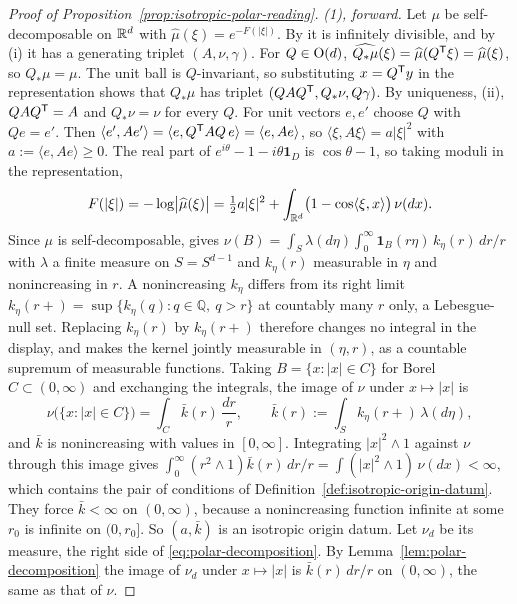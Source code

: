 \begin{proof}[Proof of Proposition~\ref{prop:isotropic-polar-reading}]
\emph{(1), forward.} Let $\mu$ be self-decomposable on $\mathbb{R}^d$ with
$\widehat\mu(\xi) = e^{-F(|\xi|)}$. By  it is infinitely divisible, and by (i)
it has a generating triplet $(A,\nu,\gamma)$. For $Q \in \mathrm{O}(d)$,
$\widehat{Q_*\mu}(\xi) = \widehat\mu(Q^{\mathsf{T}}\xi) = \widehat\mu(\xi)$, so $Q_*\mu = \mu$. The
unit ball is $Q$-invariant, so substituting $x = Q^{\mathsf{T}}y$ in the representation shows that
$Q_*\mu$ has triplet $(QAQ^{\mathsf{T}}, Q_*\nu, Q\gamma)$. By uniqueness, (ii),
$QAQ^{\mathsf{T}} = A$ and $Q_*\nu = \nu$ for every $Q$. For unit vectors $e, e'$ choose $Q$ with
$Qe = e'$. Then $\langle e',Ae'\rangle = \langle e, Q^{\mathsf{T}}AQ\,e\rangle = \langle e,Ae\rangle$, so
$\langle\xi,A\xi\rangle = a|\xi|^2$ with $a := \langle e,Ae\rangle \ge 0$. The real part of
$e^{i\theta} - 1 - i\theta\mathbf 1_D$ is $\cos\theta - 1$, so taking moduli in the representation,
\[
  F(|\xi|) = -\log\bigl|\widehat\mu(\xi)\bigr|
   = \tfrac12 a|\xi|^2 + \int_{\mathbb{R}^d}\bigl(1 - \cos\langle\xi,x\rangle\bigr)\,\nu(dx) .
\]
Since $\mu$ is self-decomposable,  gives $\nu(B) = \int_{S}\lambda(d\eta)\int_0^\infty
\mathbf 1_B(r\eta)\,k_\eta(r)\,dr/r$ with $\lambda$ a finite measure on $S = S^{d-1}$ and
$k_\eta(r)$ measurable in $\eta$ and nonincreasing in $r$.
A nonincreasing $k_\eta$ differs from its right limit
$k_\eta(r+) = \sup\{k_\eta(q) : q \in \mathbb Q,\ q > r\}$ at countably many $r$ only, a
Lebesgue-null set. Replacing $k_\eta(r)$ by $k_\eta(r+)$ therefore changes no integral in the
display, and makes the kernel jointly measurable in $(\eta,r)$, as a countable supremum of
measurable functions. Taking $B = \{x : |x| \in C\}$ for Borel $C \subset (0,\infty)$ and
exchanging the integrals, the image of $\nu$ under $x \mapsto |x|$ is
\[
  \nu\bigl(\{x : |x| \in C\}\bigr) = \int_C \bar k(r)\,\frac{dr}{r} ,
  \qquad \bar k(r) := \int_S k_\eta(r+)\,\lambda(d\eta) ,
\]
and $\bar k$ is nonincreasing with values in $[0,\infty]$. Integrating $|x|^2 \wedge 1$ against
$\nu$ through this image gives
$\int_0^\infty(r^2 \wedge 1)\bar k(r)\,dr/r = \int(|x|^2 \wedge 1)\,\nu(dx) < \infty$, which
contains the pair of conditions of Definition~\ref{def:isotropic-origin-datum}. They force $\bar k < \infty$
on $(0,\infty)$, because a nonincreasing function infinite at some $r_0$ is infinite on $(0,r_0]$.
So $(a, \bar k)$ is an isotropic origin datum. Let $\nu_d$ be its \Levy{} measure, the right side
of \ref{eq:polar-decomposition}. By Lemma~\ref{lem:polar-decomposition} the image of $\nu_d$ under
$x \mapsto |x|$ is $\bar k(r)\,dr/r$ on $(0,\infty)$, the same as that of $\nu$.


\end{proof}
